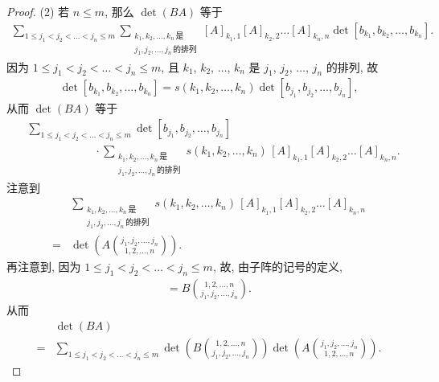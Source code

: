 \begin{proof}
    (2)
    若 \(n \leq m\),
    那么 \(\det {(BA)}\) 等于
    \begin{align*}
        \sum_{1 \leq j_1 < j_2 < \dots < j_n \leq m}
        {\sum_{\substack{
        k_1, k_2, \dots, k_n\,\text{是} \\
                    j_1, j_2, \dots, j_n\,\text{的排列}
                }}
            {[A]_{k_1,1} [A]_{k_2,2} \dots [A]_{k_n,n}
                \det {[b_{k_1}, b_{k_2}, \dots, b_{k_n}]}}}.
    \end{align*}
    因为
    \(1 \leq j_1 < j_2 < \dots < j_n \leq m\),
    且
    \(k_1\), \(k_2\), \(\dots\), \(k_n\)
    是
    \(j_1\), \(j_2\), \(\dots\), \(j_n\)
    的排列,
    故
    \begin{align*}
        \det {[b_{k_1}, b_{k_2}, \dots, b_{k_n}]}
        = s(k_1, k_2, \dots, k_n)
        \det {[b_{j_1}, b_{j_2}, \dots, b_{j_n}]},
    \end{align*}
    从而 \(\det {(BA)}\) 等于
    \begin{align*}
         &
        \sum_{1 \leq j_1 < j_2 < \dots < j_n \leq m}
        {\det {[b_{j_1}, b_{j_2}, \dots, b_{j_n}]}}
        \\
         & \qquad \qquad \qquad
        \cdot
        \sum_{\substack{
        k_1, k_2, \dots, k_n\,\text{是} \\
                j_1, j_2, \dots, j_n\,\text{的排列}
            }}
        {s(k_1, k_2, \dots, k_n)\,
            [A]_{k_1,1} [A]_{k_2,2} \dots [A]_{k_n,n}}.
    \end{align*}
    注意到
    \begin{align*}
             &
        \sum_{\substack{
        k_1, k_2, \dots, k_n\,\text{是} \\
                j_1, j_2, \dots, j_n\,\text{的排列}
            }}
        {s(k_1, k_2, \dots, k_n)\,
            [A]_{k_1,1} [A]_{k_2,2} \dots [A]_{k_n,n}}
        \\
        = {} &
        \det {\left(
            A\binom{j_1, j_2, \dots, j_n}{1, 2, \dots, n}
            \right)}.
    \end{align*}
    再注意到,
    因为
    \(1 \leq j_1 < j_2 < \dots < j_n \leq m\),
    故,
    由子阵的记号的定义,
    \begin{align*}
        [b_{j_1}, b_{j_2}, \dots, b_{j_n}]
        = B\binom{1, 2, \dots, n}{j_1, j_2, \dots, j_n}.
    \end{align*}
    从而
    \begin{align*}
             & \det {(BA)}
        \\
        = {} & \sum_{1 \leq j_1 < j_2 < \dots < j_n \leq m}
        {
            \det {\left(
                B\binom{1, 2, \dots, n}{j_1, j_2, \dots, j_n}
                \right)}
            \det {\left(
                A\binom{j_1, j_2, \dots, j_n}{1, 2, \dots, n}
                \right)}
        }.
    \end{align*}
\end{proof}

